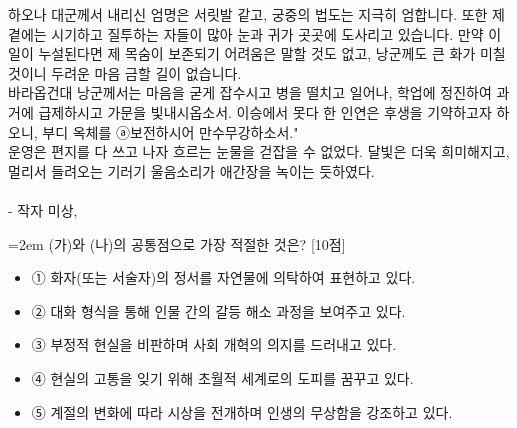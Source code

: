 \documentclass[10pt,a4paper]{article}
\newcommand{\qnum}[1]{%
  \tikz[baseline=(num.base)]{%
    \node[circle, fill=numCircle, text=white, inner sep=0pt,
          minimum size=18pt, font=\small\bfseries] (num) {#1};%
  }%
}
\newcommand{\pts}[1]{%
  \hfill\textcolor{ptsBadge}{[#1점]}%
}
\begin{document}
\begin{tcolorbox}[passage]
하오나 대군께서 내리신 엄명은 서릿발 같고, 궁중의 법도는 지극히 엄합니다. 또한 제 곁에는 시기하고 질투하는 자들이 많아 눈과 귀가 곳곳에 도사리고 있습니다. 만약 이 일이 누설된다면 제 목숨이 보존되기 어려움은 말할 것도 없고, 낭군께도 큰 화가 미칠 것이니 두려운 마음 금할 길이 없습니다. \\{}
바라옵건대 낭군께서는 마음을 굳게 잡수시고 병을 떨치고 일어나, 학업에 정진하여 과거에 급제하시고 가문을 빛내시옵소서. 이승에서 못다 한 인연은 후생을 기약하고자 하오니, 부디 옥체를 ⓐ보전하시어 만수무강하소서." \\{}
운영은 편지를 다 쓰고 나자 흐르는 눈물을 걷잡을 수 없었다. 달빛은 더욱 희미해지고, 멀리서 들려오는 기러기 울음소리가 애간장을 녹이는 듯하였다. \\{}
\vspace{4pt} \\{}
- 작자 미상,
\end{tcolorbox}
\vspace{3mm}
\begin{minipage}{\columnwidth}
{\hangindent=2em
\qnum{17}\enspace (가)와 (나)의 공통점으로 가장 적절한 것은? \pts{10}
\par}

\vspace{3mm}
\begin{itemize}[leftmargin=2.5em, labelsep=0.3em, label={}, itemsep=4pt, parsep=1pt, topsep=0pt]
  \item ① 화자(또는 서술자)의 정서를 자연물에 의탁하여 표현하고 있다.
  \item ② 대화 형식을 통해 인물 간의 갈등 해소 과정을 보여주고 있다.
  \item ③ 부정적 현실을 비판하며 사회 개혁의 의지를 드러내고 있다.
  \item ④ 현실의 고통을 잊기 위해 초월적 세계로의 도피를 꿈꾸고 있다.
  \item ⑤ 계절의 변화에 따라 시상을 전개하며 인생의 무상함을 강조하고 있다.
\end{itemize}
\end{minipage}
\vspace{4mm}
\end{document}
